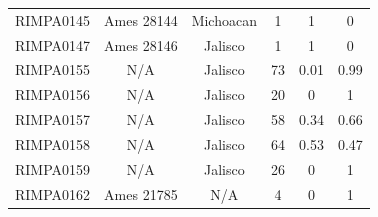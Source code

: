 \documentclass[11pt]{article}
\newcounter{rowno}
\begin{document}
\begin{scriptsize}
\begin{longtable}{>{\stepcounter{rowno}}cccccc}
    RIMPA0145 & Ames	28144 & Michoacan & 1     & 1     & 0 \\
    RIMPA0147 & Ames	28146 & Jalisco & 1     & 1     & 0 \\
    RIMPA0155 & N/A   & Jalisco & 73    & 0.01 & 0.99 \\
    RIMPA0156 & N/A   & Jalisco & 20    & 0     & 1 \\
    RIMPA0157 & N/A   & Jalisco & 58    & 0.34 & 0.66 \\
    RIMPA0158 & N/A   & Jalisco & 64    & 0.53 & 0.47 \\
    RIMPA0159 & N/A   & Jalisco & 26    & 0     & 1 \\
    RIMPA0162 & Ames	21785 & N/A   & 4     & 0     & 1 \\
    \hline
\end{longtable}
\end{scriptsize}
\clearpage



\end{document}
